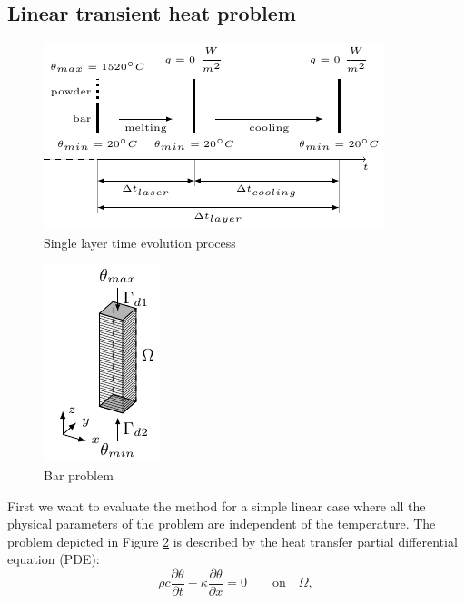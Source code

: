 \documentclass[3p]{article}
\begin{document}
\subsection*{Linear transient heat problem}
\begin{figure}[!h]
\centering
  \includegraphics[width=0.8\linewidth]{externals/Pictures/OneDimensionalPhysicalModelProcess.pdf}
  \caption{Single layer time evolution process}
  \label{fig:1DProcessLayer}
  
\end{figure}
\begin{figure}[!h]
\centering
  \includegraphics[width=0.4\linewidth]{externals/Pictures/AMBar1DInProgress_mod.pdf}
  \caption{Bar problem}
  \label{fig:1DProblem}
  
\end{figure}
First we want to evaluate the method for a simple linear case where all the physical parameters of the problem are independent of the temperature.
The problem depicted in Figure \ref{fig:1DProblem} is described by the heat transfer partial differential equation (PDE):
\begin{equation}
\rho c \dfrac{\partial\theta}{\partial t} - \kappa\dfrac{\partial\theta}{\partial x} = 0 \qquad \text{on} \quad \Omega,
\end{equation}
\end{document}
